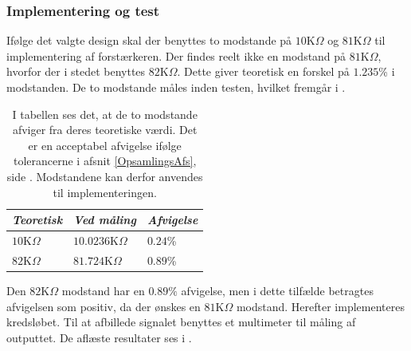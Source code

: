\subsubsection{Implementering og test}
Ifølge det valgte design skal der benyttes to modstande på $10$K$\Omega$ og $81$K$\Omega$ til implementering af forstærkeren. Der findes reelt ikke en modstand på $81$K$\Omega$, hvorfor der i stedet benyttes $82$K$\Omega$. Dette giver teoretisk en forskel på $1.235$\% i modstanden. %
De to modstande måles inden testen, hvilket fremgår i .
\begin{table}[H]
	\centering
	\begin{tabular}{|l|l|l|}
		\hline
		\textit{Teoretisk} & \textit{Ved måling} & \textit{Afvigelse} \\ \hline
		$10$K$\Omega$      & $10.0236$K$\Omega$    & $0.24$\%           \\ \hline
		$82$K$\Omega$      & $81.724$K$\Omega$     & $0.89$\%           \\ \hline
	\end{tabular}
	\caption{I tabellen ses det, at de to modstande afviger fra deres teoretiske værdi. Det er en acceptabel afvigelse ifølge tolerancerne i afsnit \ref{OpsamlingsAfs}, side \pageref{OpsamlingsAfs}. Modstandene kan derfor anvendes til implementeringen.}
	\label{Tab:modstand_faktor18}
\end{table}
\noindent Den $82$K$\Omega$ modstand har en $0.89\%$ afvigelse, men i dette tilfælde betragtes afvigelsen som positiv, da der ønskes en $81$K$\Omega$ modstand. Herefter implementeres kredsløbet. Til at afbillede signalet benyttes et multimeter til måling af outputtet. De aflæste resultater ses i .
